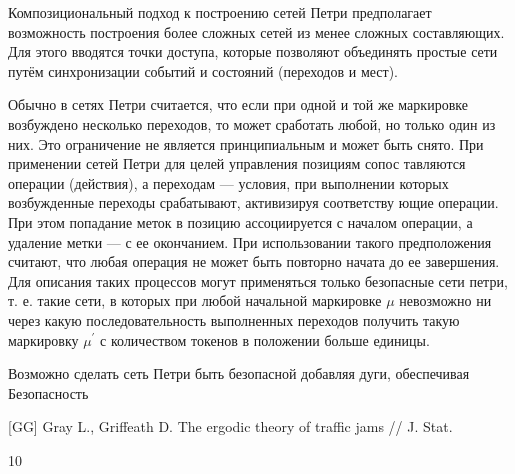 \documentclass[a4paper,14pt]{article}
\begin{document}
\par Композициональный подход к построению сетей Петри предполагает возможность построения более сложных сетей из менее сложных составляющих. Для этого вводятся точки доступа, которые позволяют объединять простые сети путём синхронизации событий и состояний (переходов и мест).
\par Обычно в сетях Петри считается, что если при одной и той же маркировке возбуждено несколько переходов, то может сработать любой, но только один из них. Это ограничение не является принципиальным и может быть снято.
При применении сетей Петри для целей управления позициям сопос­
тавляются операции (действия), а переходам — условия, при выполнении
которых возбужденные переходы срабатывают, активизируя соответству­ ющие операции. При этом попадание меток в позицию ассоциируется с началом операции, а удаление метки — с ее окончанием. При использовании такого предположения считают, что любая операция не может быть повторно начата до ее завершения. Для описания таких процессов могут применяться только безопасные сети петри, т. е. такие сети, в которых при любой начальной маркировке $\mu$ невозможно ни через какую последовательность выполненных переходов получить такую маркировку $\mu^{'}$ с количеством токенов в положении больше единицы.
\par Возможно сделать сеть Петри быть безопасной добавляя дуги, обеспечивая 
Безопасность 







\begin{thebibliography}{10}
[GG] Gray L., Griffeath D. The ergodic theory of traffic jams // J. Stat. 
\end{thebibliography}{10}
\end{document}
